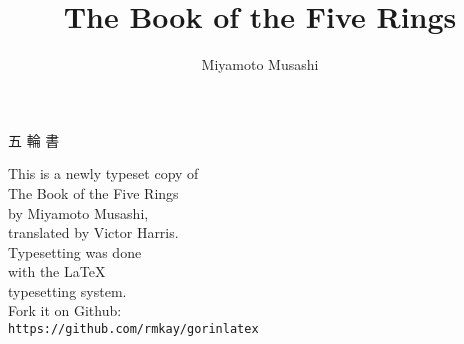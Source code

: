 \documentclass[paper=a6]{book}
\begin{document}
\pagestyle{empty}
\setcounter{secnumdepth}{-1} 
\setlength{\parindent}{0cm}




\vspace*{2cm}
\begin{center}
  \begin{CJK*}{UTF8}{mj}
{\Huge 五 輪 書}
  \end{CJK*}
\end{center}
\cleardoublepage
\begin{figure}
\begin{alltt}
\singlespacing
\centering
\texttt{}
\end{alltt}
\end{figure}
\clearpage

\begin{center}
\vspace*{1cm}
This is a newly typeset copy of \\ 
The Book of the Five Rings\\ 
by Miyamoto Musashi,\\
translated by Victor Harris.\\
\vspace{2cm}
Typesetting was done \\ 
with the \LaTeX \\
typesetting system.\\
\vfill
Fork it on Github:\\
\texttt{https://github.com/rmkay/gorinlatex}\\


\end{center}

\title{\textbf{The Book of the Five Rings}}
\author{Miyamoto Musashi}
\date{}
\maketitle


{}
\manualmark
\markboth{\spacedlowsmallcaps{\contentsname}}{\spacedlowsmallcaps{\contentsname}}
\clearpage
\tableofcontents 
{}
\cleardoublepage
{}
\renewcommand{\chaptermark}[1]{\markboth{\spacedlowsmallcaps{#1}}{\spacedlowsmallcaps{#1}}}
\renewcommand{\sectionmark}[1]{\markright{\thesection\enspace\spacedlowsmallcaps{#1}}}
\pagestyle{plain}


\setcounter{secnumdepth}{0} 





\end{document}
